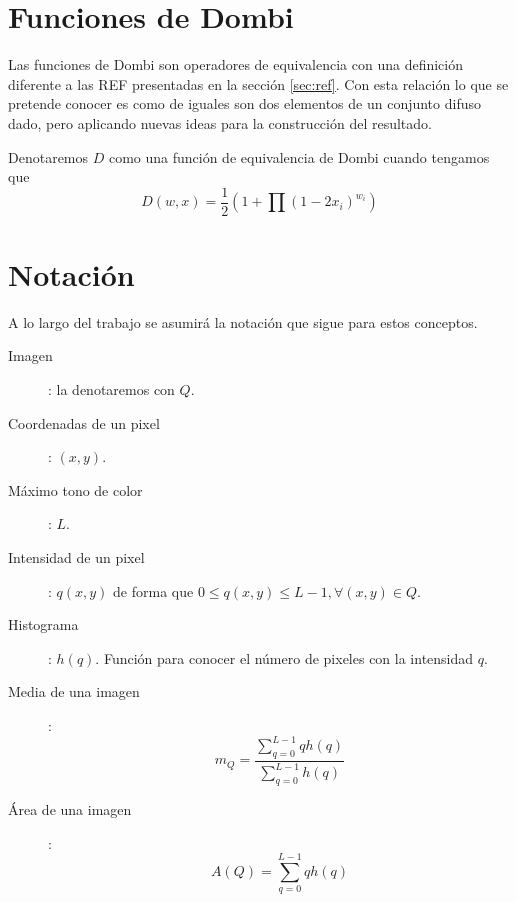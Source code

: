 \section{Funciones de Dombi}\label{sec:dombi}
Las funciones de Dombi \cite{art:dombi} son operadores de equivalencia con una definición diferente a las REF presentadas en la sección \ref{sec:ref}. Con esta relación lo que se pretende conocer es como de iguales son dos elementos de un conjunto difuso dado, pero aplicando nuevas ideas para la construcción del resultado. 
\begin{definition}
Denotaremos $D$ como una función de equivalencia de Dombi cuando tengamos que 
$$D(w,x)=\frac{1}{2}\left(1+\prod(1-2x_{i})^{w_{i}}\right)$$
\end{definition}




\section{Notación}\label{sec:notacion}

A lo largo del trabajo se asumirá la notación que sigue para estos conceptos.

\begin{description}
    \item[Imagen]: la denotaremos con $Q$.
    \item[Coordenadas de un pixel]: $(x,y)$.
    \item[Máximo tono de color]: $L$.
    \item[Intensidad de un pixel]: $q(x,y)$ de forma que $0\leq q(x,y)\leq L-1, \forall (x,y)\in Q$.  
    \item[Histograma]: $h(q)$. Función para conocer el número de pixeles con la intensidad $q$. 
    \item[Media de una imagen]:$$m_Q=\frac{\sum_{q=0}^{L-1}qh(q)}{\sum_{q=0}^{L-1}h(q)}$$
    \item[Área de una imagen]: $$A(Q) = \sum_{q=0}^{L-1} q h(q)$$
\end{description}























